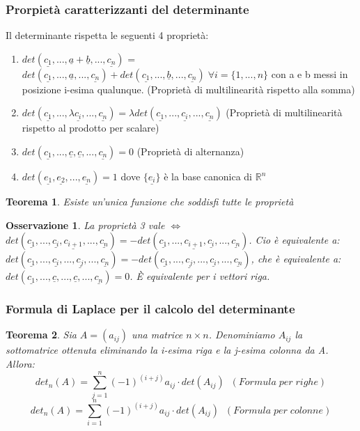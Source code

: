 \documentclass[12pt]{article}
\newenvironment{para}{\begin{adjustwidth}{13mm}{}}{\end{adjustwidth}}
\newtheorem{Teorema}{Teorema}[subsection]
\newtheorem{Osservazione}{Osservazione}[subsection]
\begin{document}
\begin{para}
\subsubsection{Prorpietà caratterizzanti del determinante}
Il determinante rispetta le seguenti 4 proprietà:
\begin{enumerate}
    \item $det(\underline{c_1}, ..., \underline{a}+\underline{b},...,\underline{c_n})$ = $det(\underline{c_1}, ..., \underline{a},...,\underline{c_n}) + det(\underline{c_1}, ..., \underline{b},...,\underline{c_n}) \; \forall i=\{1,...,n\}$ con a e b messi in posizione i-esima qualunque. (Proprietà di multilinearità rispetto alla somma)
    \item $det(\underline{c_1}, ..., \lambda\underline{c_i}, ..., \underline{c_n}) = \lambda det(\underline{c_1}, ..., \underline{c_i}, ..., \underline{c_n})$ (Proprietà di multilinearità rispetto al prodotto per scalare)
    \item $det(\underline{c_1}, ..., \underline{c}, \underline{c}, ..., \underline{c_n}) = 0$ (Proprietà di alternanza)
    \item $det(\underline{e_1}, \underline{e_2}, ..., \underline{e_n}) = 1$ dove $\{\underline{e_i}\}$ è la base canonica di $\mathbb{R}^n$
\end{enumerate}

\begin{Teorema}
Esiste un'unica funzione che soddisfi tutte le proprietà
\end{Teorema}

\begin{Osservazione}
    La proprietà 3 vale $\Leftrightarrow$ $det(\underline{c_1}, ..., \underline{c_i}, \underline{c_{i+1}}, ..., \underline{c_n}) = -det(\underline{c_1}, ..., \underline{c_{i+1}},\underline{c_i}, ..., \underline{c_n})$. Cio è equivalente a: $det(\underline{c_1}, ..., \underline{c_i}, ..., \underline{c_{j}}, ..., \underline{c_n}) = -det(\underline{c_1}, ..., \underline{c_j}, ..., \underline{c_{i}}, ..., \underline{c_n})$, che è equivalente a:
$det(\underline{c_1}, ..., \underline{c}, ..., \underline{c}, ..., \underline{c_n}) = 0$. È equivalente per i vettori riga.
\end{Osservazione}
\subsubsection{Formula di Laplace per il calcolo del determinante}
\begin{Teorema}
    Sia $A = (a_{ij})$ una matrice $n \times n$. Denominiamo $A_{ij}$ la sottomatrice ottenuta eliminando la i-esima riga e la j-esima colonna da A. Allora:$$det_n(A)=\sum_{j=1}^n{(-1)^{(i+j)}a_{ij} \cdot det(A_{ij})} \; \; (Formula \; per \; righe)$$
    $$det_n(A)=\sum_{i=1}^n{(-1)^{(i+j)}a_{ij} \cdot det(A_{ij})} \; \; (Formula \; per \; colonne)$$
\end{Teorema}


\end{para}
\end{document}
